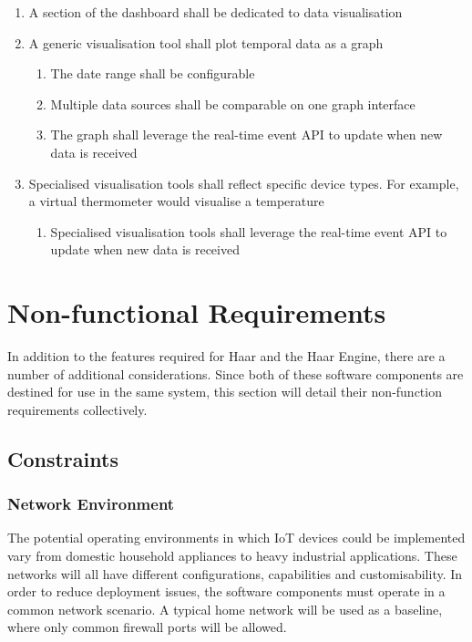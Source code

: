         \begin{enumerate}
          \item A section of the dashboard shall be dedicated to data visualisation
          \item A generic visualisation tool shall plot temporal data as a graph
          \begin{enumerate}
            \item The date range shall be configurable
            \item Multiple data sources shall be comparable on one graph interface
            \item The graph shall leverage the real-time event API to update when new data is received
          \end{enumerate}
          \item Specialised visualisation tools shall reflect specific device types. For example, a virtual thermometer would visualise a temperature
          \begin{enumerate}
            \item Specialised visualisation tools shall leverage the real-time event API to update when new data is received
          \end{enumerate}
        \end{enumerate}

  \section{Non-functional Requirements}
    In addition to the features required for Haar and the Haar Engine, there are a number of additional considerations. Since both of these software components are destined for use in the same system, this section will detail their non-function requirements collectively.

    \subsection{Constraints}
      \subsubsection{Network Environment}
        The potential operating environments in which IoT devices could be implemented vary from domestic household appliances to heavy industrial applications. These networks will all have different configurations, capabilities and customisability. In order to reduce deployment issues, the software components must operate in a common network scenario. A typical home network will be used as a baseline, where only common firewall ports will be allowed.

